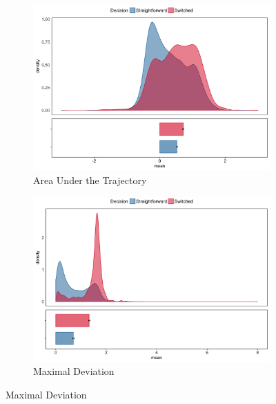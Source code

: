 \documentclass[draft]{article}
\begin{document}
\begin{figure}
\centering
\begin{subfigure}[b]{0.4\textwidth}
\includegraphics[width=\textwidth]{AUC_calibration.png}
\caption{Area Under the Trajectory}
\end{subfigure}
%
\begin{subfigure}[b]{0.4\textwidth}
\includegraphics[width=\textwidth]{MD_calibration.png}
\caption{Maximal Deviation}
\end{subfigure}


\end{figure}
\end{document}
